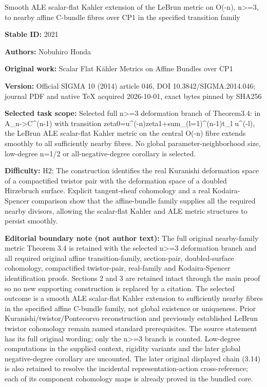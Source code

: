 \documentclass[11pt]{article}
\numberwithin{equation}{section}
\begin{document}
\begin{center}\Large Smooth ALE scalar-flat Kahler extension of the LeBrun metric on O(-n), n>=\allowbreak{}3, to nearby affine C-bundle fibres over CP1 in the specified transition family\end{center}
\noindent\textbf{Stable ID:} 2021\par
\noindent\textbf{Authors:} Nobuhiro Honda\par
\noindent\textbf{Original work:} Scalar Flat Kähler Metrics on Affine Bundles over CP1\par
\noindent\textbf{Version:} Official SIGMA 10 (2014) article 046, DOI 10.3842/SIGMA.2014.046; journal PDF and native TeX acquired 2026-10-01, exact bytes pinned by SHA256\par
\noindent\textbf{Selected task scope:} Selected full n>=\allowbreak{}3 deformation branch of Theorem3.4: in A\_n->C\textasciicircum{}(n-1) with transition zeta0=\allowbreak{}u\textasciicircum{}(-n)zeta1+\allowbreak{}sum\_(l=\allowbreak{}1)\textasciicircum{}(n-1)t\_l u\textasciicircum{}(-l), the LeBrun ALE scalar-flat Kahler metric on the central O(-n) fibre extends smoothly to all sufficiently nearby fibres. No global parameter-neighborhood size, low-degree n=\allowbreak{}1/2 or all-negative-degree corollary is selected.\par
\noindent\textbf{Difficulty:} H2: The construction identifies the real Kuranishi deformation space of a compactified twistor pair with the deformation space of a doubled Hirzebruch surface. Explicit tangent-sheaf cohomology and a real Kodaira-Spencer comparison show that the affine-bundle family supplies all the required nearby divisors, allowing the scalar-flat Kahler and ALE metric structures to persist smoothly.\par
\noindent\textbf{Editorial boundary note (not author text):} The full original nearby-family metric Theorem 3.4 is retained with the selected n>=\allowbreak{}3 deformation branch and all required original affine transition-family, section-pair, doubled-surface cohomology, compactified twistor-pair, real-family and Kodaira-Spencer identification proofs. Sections 2 and 3 are retained intact through the main proof so no new supporting construction is replaced by a citation. The selected outcome is a smooth ALE scalar-flat Kahler extension to sufficiently nearby fibres in the specified affine C-bundle family, not global existence or uniqueness. Prior Kuranishi/twistor/Pontecorvo reconstruction and previously established LeBrun twistor cohomology remain named standard prerequisites. The source statement has its full original wording; only the n>=\allowbreak{}3 branch is counted. Low-degree computations in the supplied context, rigidity variants and the later global negative-degree corollary are uncounted. The later original displayed chain (3.14) is also retained to resolve the incidental representation-action cross-reference; each of its component cohomology maps is already proved in the bundled core.\par
\end{document}
